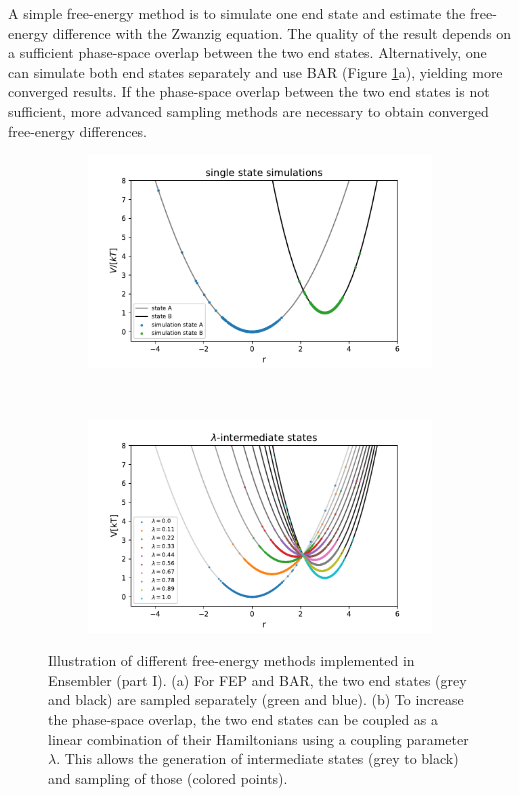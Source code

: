 A simple free-energy method is to simulate one end state and estimate the free-energy difference with the Zwanzig equation.\cite{Zwanzig1954} The quality of the result depends on a sufficient phase-space overlap between the two end states.\cite{Konig2018}
Alternatively, one can simulate both end states separately and use BAR\cite{Bennett1976} (Figure \ref{fig:FE_sampling}a), yielding more converged results.\cite{Konig2018}
If the phase-space overlap between the two end states is not sufficient, more advanced sampling methods are necessary to obtain converged free-energy differences.
%
\begin{figure}[h]
	\centering
	\begin{subfigure}{.85\textwidth}
		\caption{}
		\includegraphics[width=\linewidth]{fig/FE_example/freeEnergyPertubation.pdf} 
	\end{subfigure}\\
	\begin{subfigure}{.85\textwidth}
		\caption{}
		\includegraphics[width=\linewidth]{fig/FE_example/linear_coupled.pdf} 
	\end{subfigure}
	\caption{Illustration of different free-energy methods implemented in Ensembler (part I). (a) For FEP\cite{Zwanzig1954} and BAR\cite{Bennett1976}, the two end states (grey and black) are sampled separately (green and blue). (b) To increase the phase-space overlap, the two end states can be coupled as a linear combination of their Hamiltonians using a coupling parameter $\lambda$. This allows the generation of intermediate states (grey to black) and sampling of those (colored points).}
	\label{fig:FE_sampling}
\end{figure}

